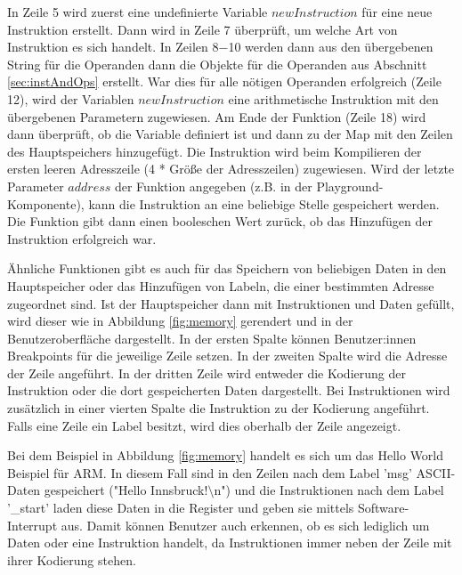 \documentclass[a4paper, 11pt, onecolumn]{article}
\begin{document}
In Zeile 5 wird zuerst eine undefinierte Variable $newInstruction$ für eine neue Instruktion erstellt. Dann wird in Zeile 7 überprüft, um welche Art von Instruktion es sich handelt. In Zeilen 8$-$10 werden dann aus den übergebenen String für die Operanden dann die Objekte für die Operanden aus Abschnitt \ref{sec:instAndOps} erstellt. War dies für alle nötigen Operanden erfolgreich (Zeile 12), wird der Variablen $newInstruction$ eine arithmetische Instruktion mit den übergebenen Parametern zugewiesen. Am Ende der Funktion (Zeile 18) wird dann überprüft, ob die Variable definiert ist und dann zu der Map mit den Zeilen des Hauptspeichers hinzugefügt. Die Instruktion wird beim Kompilieren der ersten leeren Adresszeile (4 * Größe der Adresszeilen) zugewiesen. Wird der letzte Parameter $address$ der Funktion angegeben (z.B. in der Playground-Komponente), kann die Instruktion an eine beliebige Stelle gespeichert werden. Die Funktion gibt dann einen booleschen Wert zurück, ob das Hinzufügen der Instruktion erfolgreich war.

Ähnliche Funktionen gibt es auch für das Speichern von beliebigen Daten in den Hauptspeicher oder das Hinzufügen von Labeln, die einer bestimmten Adresse zugeordnet sind. Ist der Hauptspeicher dann mit Instruktionen und Daten gefüllt, wird dieser wie in Abbildung \ref{fig:memory} gerendert und in der Benutzeroberfläche dargestellt. In der ersten Spalte können Benutzer:innen Breakpoints für die jeweilige Zeile setzen. In der zweiten Spalte wird die Adresse der Zeile angeführt. In der dritten Zeile wird entweder die Kodierung der Instruktion oder die dort gespeicherten Daten dargestellt. Bei Instruktionen wird zusätzlich in einer vierten Spalte die Instruktion zu der Kodierung angeführt. Falls eine Zeile ein Label besitzt, wird dies oberhalb der Zeile angezeigt.

Bei dem Beispiel in Abbildung \ref{fig:memory} handelt es sich um das Hello World Beispiel für ARM. In diesem Fall sind in den Zeilen nach dem Label 'msg' ASCII-Daten gespeichert ("Hello Innsbruck!$\setminus$n") und die Instruktionen nach dem Label '\_start' laden diese Daten in die Register und geben sie mittels Software-Interrupt aus. Damit können Benutzer auch erkennen, ob es sich lediglich um Daten oder eine Instruktion handelt, da Instruktionen immer neben der Zeile mit ihrer Kodierung stehen.
\end{document}

